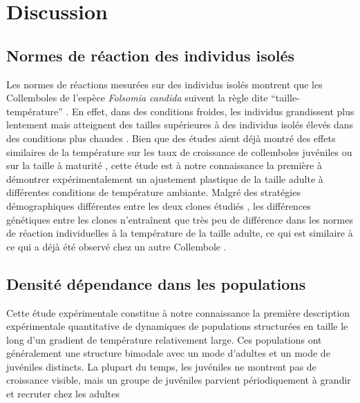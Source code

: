 \section{Discussion}

\subsection{Normes de réaction des individus isolés}

Les normes de réactions mesurées sur des individus isolés montrent que les
Collemboles de l'espèce \textit{Folsomia candida} suivent la règle dite
``taille-température'' \autocites{atkinson1994a,angilletta2009a}. En effet,
dans des conditions froides, les individus grandissent plus lentement mais
atteignent des tailles supérieures à des individus isolés élevés dans des
conditions plus chaudes \autocites{angilletta2003a}. Bien que des études aient
déjà montré des effets similaires de la température sur les taux de croissance
de collemboles juvéniles \autocites{birkemoe2000a, driessen2007a, ellers2008a,
ellers2011b} ou sur la taille à maturité \autocites{stam1996a}, cette étude est
à notre connaissance la première à démontrer expérimentalement un ajustement
plastique de la taille adulte à différentes conditions de température ambiante.
Malgré des stratégies démographiques différentes entre les deux clones étudiés
\autocites{tully2008a,tully2011a}, les différences génétiques entre les clones
n'entraînent que très peu de différence dans les normes de réaction
individuelles à la température de la taille adulte, ce qui est similaire à ce
qui a déjà été observé chez un autre Collembole \autocites{driessen2007a}.

\subsection{Densité dépendance dans les populations}

Cette étude expérimentale constitue à notre connaissance la première description
expérimentale quantitative de dynamiques de populations structurées en taille le
long d'un gradient de température relativement large. Ces populations ont
généralement une structure bimodale avec un mode d'adultes et un mode de
juvéniles distincts. La plupart du temps, les juvéniles ne montrent pas de
croissance visible, mais un groupe de juvéniles parvient périodiquement à
grandir et recruter chez les adultes 

